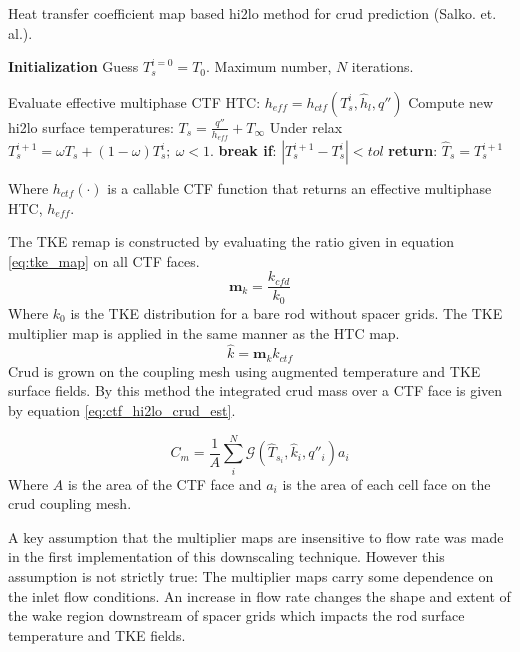     \begin{algorithm}[H]
        \caption{Heat transfer coefficient map based hi2lo method for crud prediction (Salko. et. al.).}
    \begin{algorithmic}[1]
    \STATE \textbf{Initialization} 
    \STATE Guess $T^{i=0}_s=T_0$.  Maximum number, $N$ iterations.

           \STATE Evaluate effective multiphase CTF HTC: $h_{eff} = h_{{ctf}}(T^i_{s}, \hat h_l, q'')$ \;
           \STATE Compute new hi2lo surface temperatures: $T_{s} = \frac{q''}{h_{eff}} + T_\infty$ \;
           \STATE  Under relax  $T^{i+1}_{s} = \omega T_{s} + (1 - \omega) T^{i}_{s} ;\ \omega < 1.$ \;
           \STATE  \textbf{break if}:  $|T^{i+1}_s - T^i_s| < tol$ \;
        \ENDFOR 
    \STATE \textbf{return}: $\hat T_s = T^{i+1}_s$
    \end{algorithmic}
    \end{algorithm}
    Where $h_{ctf}(\cdot)$ is a callable CTF function that returns an effective multiphase HTC, $h_{eff}$.

    The TKE remap is constructed by evaluating the ratio given in equation \ref{eq:tke_map} on all CTF faces.
    \begin{equation}
       \mathbf m_{k} = \frac{k_{cfd}}{k_{0}}
       \label{eq:tke_map}
    \end{equation}
    Where $k_0$ is the TKE distribution for a bare rod without spacer grids.
    The TKE multiplier map is applied in the same manner as the HTC map.
       \begin{equation}
       \hat k = \mathbf m_k k_{ctf}
       \end{equation}
Crud is grown on the coupling mesh using augmented temperature and TKE surface fields. By this method the integrated crud mass over a CTF face is given by equation \ref{eq:ctf_hi2lo_crud_est}.

 \begin{equation}
     C_m = \frac{1}{A} \sum_i^N \mathcal G(\hat T_{s_i}, \hat k_i, q''_i) a_i
 \label{eq:ctf_hi2lo_crud_est}
 \end{equation}
Where $A$ is the area of the CTF face and $a_i$ is the area of each cell face on the crud coupling mesh.

A key assumption that the multiplier maps are insensitive to flow rate was made in the first implementation of this downscaling technique.  However this assumption is not strictly true: The multiplier maps carry some dependence on the inlet flow conditions.  An increase in flow rate changes the shape and extent of the wake region downstream of spacer grids which impacts the rod surface temperature and TKE fields.

